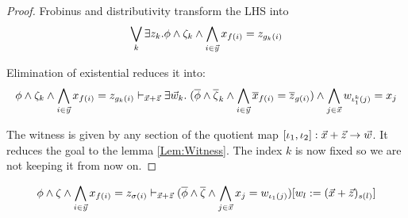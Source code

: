 \begin{proof}
  Frobinus and distributivity transform the LHS into 
  \begin{equation}
     \bigvee_k \exists z_k. \phi\land \zeta_k \land \bigwedge_{i\in \vec{y}} x_{f(i)} = z_{g_k(i)}
  \end{equation}


  Elimination of existential reduces it into:
  \begin{equation*}
    \phi\land \zeta_k \land \bigwedge_{i\in \vec{y}} x_{f(i)} = z_{g_k(i)} \vdash_{\vec{x} + \vec{z}}
    \exists \vec{w}_k.\;(\overline{\phi}\land \overline{\zeta}_k \land\bigwedge_{i\in \vec{y}} \overline{x}_{f(i)} = \overline{z}_{g(i)}) \land \bigwedge_{j\in\vec{x}}w_{{\iota^k_1(j)}} = x_j 
  \end{equation*}

  The witness is given by any section of the quotient map $[\iota_1,\iota_2]:\vec{x} + \vec{z} \to \vec{w}$. It reduces the goal to the lemma \ref{Lem:Witness}.
  The index $k$ is now fixed so we are not keeping it from now on.
\end{proof}

  
\begin{lemma}\label{Lem:Witness}
  \begin{equation*}
    \phi\land \zeta\land \bigwedge_{i\in \vec{y}} x_{f(i)} = z_{\sigma(i)}\vdash_{\vec{x} + \vec{z}} (\overline{\phi}\land \overline{\zeta}\land\bigwedge_{j\in\vec{x}} x_j = w_{\iota_1(j)})[w_l:=(\vec{x}+\vec{z})_{s(l)}] 
  \end{equation*}
\end{lemma}

